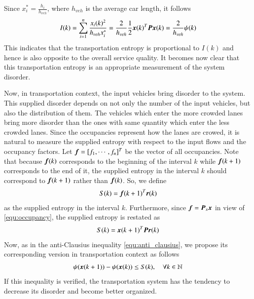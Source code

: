\documentclass[preprint,authoryear,12pt]{elsarticle}
\renewcommand{\vec}[1]{\mbox{\boldmath$#1$}}
\newcommand{\mat}[1]{\mbox{\boldmath$#1$}}
\begin{document}
Since $x_i^*=\frac{h_i}{h_{veh}}$, where $h_{veh}$ is the average car
length, it follows
\begin{equation}
I(k) = \sum_{i=1}^{n}\frac{x_i(k)^2}{h_{veh} x_i^*}
= \frac{2}{h_{veh}} \frac{1}{2}\vec{x}(k)^T\mat{P}\vec{x}(k)
= \frac{2}{h_{veh}} \psi(k)
\end{equation}
This indicates that the transportation entropy is proportional to
$I(k)$ and hence is also opposite to the overall service quality. It
becomes now clear that this transportation entropy is an appropriate
measurement of the system disorder.

Now, in transportation context, the input vehicles bring disorder to
the system. This supplied disorder depends on not only the number of
the input vehicles, but also the distribution of them. The vehicles
which enter the more crowded lanes bring more disorder than the ones
with same quantity which enter the less crowded lanes. Since the
occupancies represent how the lanes are crowed, it is natural to
measure the supplied entropy with respect to the input flows and the
occupancy factors. Let $\vec{f}=[f_1,\cdots,f_n]^T$ be the vector of
all occupancies. Note that because $\vec{f}(k)$ corresponds to the
beginning of the interval $k$ while $\vec{f}(k+1)$ corresponds to the
end of it, the supplied entropy in the interval $k$ should correspond
to $\vec{f}(k+1)$ rather than $\vec{f}(k)$. So, we define
$$S(k)=\vec{f}(k+1)^T\vec{r}(k)$$
as the supplied entropy in the interval $k$. Furthermore, since
$\vec{f}=\mat{P}_x\vec{x}$ in view of \eqref{equ:occupancy}, the
supplied entropy is restated as
\begin{equation}\label{equ:supply}
    S(k)=\vec{x}(k+1)^T \mat{P} \vec{r}(k)
\end{equation}
Now, as in the anti-Clausius inequality \eqref{equ:anti_clausius}, we
propose its corresponding version in transportation context as
follows
\begin{equation}\label{equ:dissipative}
\psi(\vec{x}(k+1))-\psi(\vec{x}(k)) \leq S(k),\quad \forall
k\in\mathbb{N}
\end{equation}
If this inequality is verified, the transportation system has the
tendency to decrease its disorder and become better organized.
\end{document}
